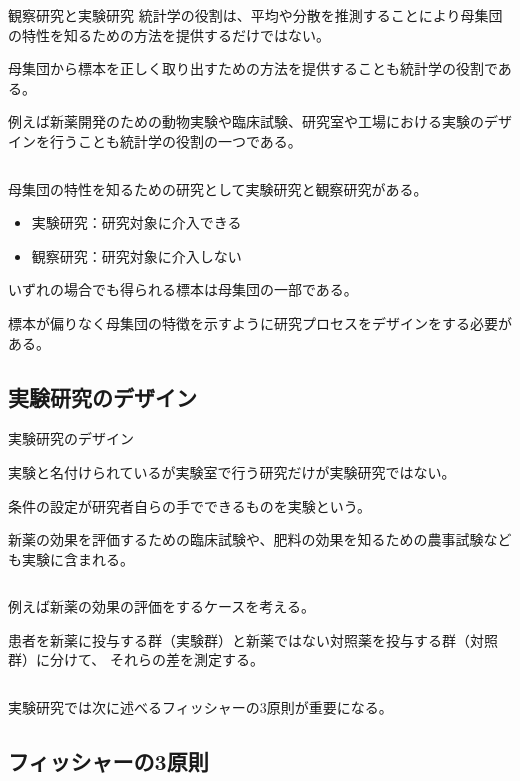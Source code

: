 \documentclass[dvipdfmx, autodetect-engine, aspectratio=169, 10.5pt]{beamer}
\begin{document}
\begin{frame}{観察研究と実験研究}
	統計学の役割は、平均や分散を推測することにより母集団の特性を知るための方法を提供するだけではない。

	母集団から標本を正しく取り出すための方法を提供することも統計学の役割である。

	例えば新薬開発のための動物実験や臨床試験、研究室や工場における実験のデザインを行うことも統計学の役割の一つである。

	${}$

	母集団の特性を知るための研究として実験研究と観察研究がある。

	\begin{itemize}
		\item 実験研究：研究対象に介入できる
		\item 観察研究：研究対象に介入しない
	\end{itemize}

	いずれの場合でも得られる標本は母集団の一部である。

	標本が偏りなく母集団の特徴を示すように研究プロセスをデザインをする必要がある。

\end{frame}

\subsection{実験研究のデザイン}

\begin{frame}{実験研究のデザイン}

	実験と名付けられているが実験室で行う研究だけが実験研究ではない。

	条件の設定が研究者自らの手でできるものを実験という。

	新薬の効果を評価するための臨床試験や、肥料の効果を知るための農事試験なども実験に含まれる。

	${}$

	例えば新薬の効果の評価をするケースを考える。

	患者を新薬に投与する群（実験群）と新薬ではない対照薬を投与する群（対照群）に分けて、
	それらの差を測定する。

	${}$

	実験研究では次に述べるフィッシャーの3原則が重要になる。

\end{frame}

\subsection{フィッシャーの3原則}
\end{document}
